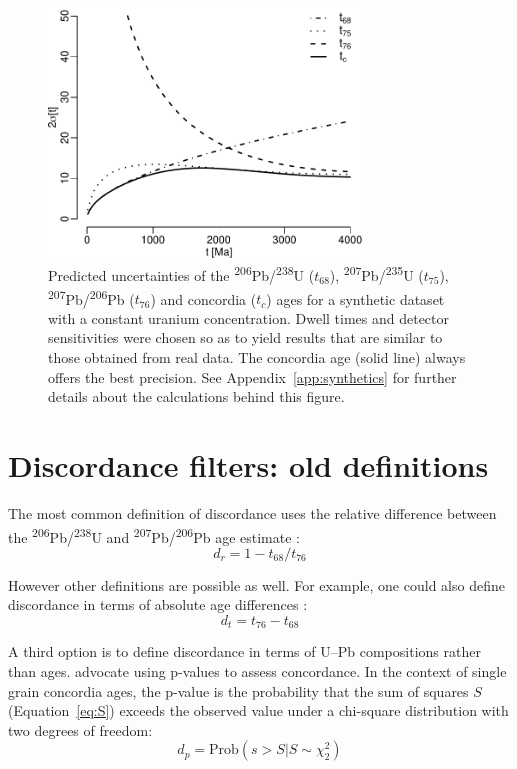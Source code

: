 \documentclass{article}
\begin{document}
\begin{figure}[t]
  \includegraphics[width=8.3cm]{agerr.pdf}
  \caption{Predicted uncertainties of the
    \textsuperscript{206}Pb/\textsuperscript{238}U ($t_{68}$),
    \textsuperscript{207}Pb/\textsuperscript{235}U ($t_{75}$),
    \textsuperscript{207}Pb/\textsuperscript{206}Pb ($t_{76}$) and
    concordia ($t_c$) ages for a synthetic dataset with a constant
    uranium concentration. Dwell times and detector sensitivities were
    chosen so as to yield results that are similar to those obtained
    from real data. The concordia age (solid line) always offers the
    best precision. See Appendix~\ref{app:synthetics} for further
    details about the calculations behind this figure.}
  \label{fig:precision}
\end{figure}

\section{Discordance filters: old definitions}\label{sec:discordance1}

The most common definition of discordance uses the relative difference
between the \textsuperscript{206}Pb/\textsuperscript{238}U and
\textsuperscript{207}Pb/\textsuperscript{206}Pb age estimate 
\citep{gehrels2011}:
\begin{equation}
  d_r = 1 - t_{68}/t_{76}
  \label{eq:dr}
\end{equation}

However other definitions are possible as well. For example, one could
also define discordance in terms of absolute age differences
\citep{puetz2018}:
\begin{equation}
  d_t = t_{76} - t_{68}
  \label{eq:dt}
\end{equation}

A third option is to define discordance in terms of U--Pb compositions
rather than ages. \citet{spencer2016} advocate using p-values to
assess concordance. In the context of single grain concordia ages, the
p-value is the probability that the sum of squares $S$
(Equation~\ref{eq:S}) exceeds the observed value under a chi-square
distribution with two degrees of freedom:
\begin{equation}
  d_p = \mbox{Prob}\left(s > S | S \sim \chi^2_2
    \right)
  \label{eq:dp}
\end{equation}
\end{document}
